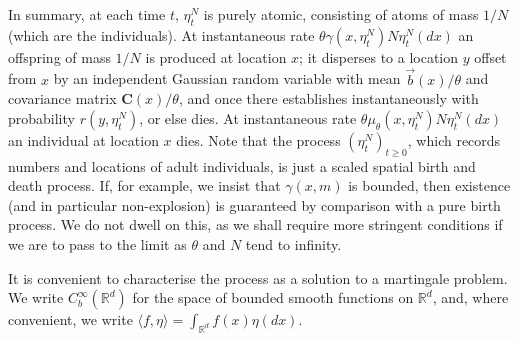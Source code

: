 \documentclass[EJP]{ejpecp} %
\newcommand{\IR}{\mathbb R}
\newcommand{\meanq}{\vec b}    %
\newcommand{\covq}{\mathbf{C}}     %
\begin{document}
In summary, at each time $t$, $\eta^N_t$ is purely atomic, consisting of atoms of mass $1/N$
(which are the individuals).
At instantaneous rate $\theta \gamma(x, \eta^N_t) N \eta^N_t(dx)$ an offspring of mass $1/N$ is 
produced at location $x$; it disperses to 
a location $y$ offset from $x$
by an independent Gaussian random variable with mean $\meanq(x) / \theta$ 
and covariance matrix $\covq(x) / \theta$,
and once there establishes instantaneously 
with probability $r(y, \eta^N_t)$, or else dies. 
At instantaneous rate $\theta \mu_\theta(x, \eta^N_t) N \eta^N_t(dx)$ an individual at location 
$x$ dies.
Note that the process 
$\left(\eta^N_t\right)_{t\ge 0}$, which
records numbers and locations of adult individuals, is just a scaled spatial birth and 
death process. If, for example, we insist that $\gamma(x,m)$ is bounded, then 
existence (and in particular non-explosion) is guaranteed by comparison with
a pure birth process. We do not dwell on this, as we shall require more stringent conditions
if we are to pass to the limit as $\theta$ and $N$ tend to infinity.

It is convenient to characterise the process as a solution to a martingale problem.
We write $C_b^\infty(\IR^d)$ for the space of bounded smooth functions on $\IR^d$, and, where
convenient, we
write $\langle f, \eta \rangle = \int_{\IR^d} f(x) \eta(dx)$.
\end{document}
